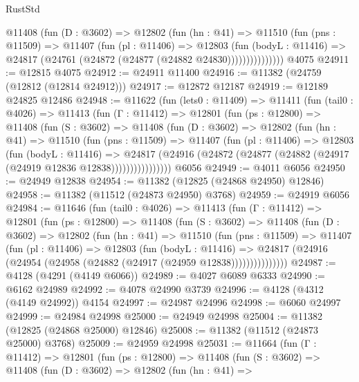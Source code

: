 \begin{lexlean}{RustStd}
\begin{coremodule}
              @11408
                (fun (D : @3602) =>
                @12802
                  (fun (hn : @41) =>
                  @11510
                    (fun (pns : @11509) =>
                    @11407
                      (fun (pl : @11406) =>
                      @12803
                        (fun (bodyL : @11416) =>
                        @24817 (@24761 (@24872 (@24877 (@24882 @24830)))))))))))))))
    @4075
@24911 := @12815 @4075
@24912 := @24911 @11400
@24916 := @11382 (@24759 (@12812 (@12814 @24912)))
@24917 := @12872 @12187
@24919 := @12189 @24825 @12486
@24948 := @11622
    (fun (lets0 : @11409) =>
    @11411
      (fun (tail0 : @4026) =>
      @11413
        (fun (Γ : @11412) =>
        @12801
          (fun (ps : @12800) =>
          @11408
            (fun (S : @3602) =>
            @11408
              (fun (D : @3602) =>
              @12802
                (fun (hn : @41) =>
                @11510
                  (fun (pns : @11509) =>
                  @11407
                    (fun (pl : @11406) =>
                    @12803
                      (fun (bodyL : @11416) =>
                      @24817
                        (@24916
                          (@24872 (@24877 (@24882 (@24917 (@24919 @12836 @12838))))))))))))))))
    @6056
@24949 := @4011 @6056
@24950 := @24949 @12838
@24954 := @11382 (@12825 (@24868 @24950) @12846)
@24958 := @11382 (@11512 (@24873 @24950) @3768)
@24959 := @24919 @6056
@24984 := @11646
    (fun (tail0 : @4026) =>
    @11413
      (fun (Γ : @11412) =>
      @12801
        (fun (ps : @12800) =>
        @11408
          (fun (S : @3602) =>
          @11408
            (fun (D : @3602) =>
            @12802
              (fun (hn : @41) =>
              @11510
                (fun (pns : @11509) =>
                @11407
                  (fun (pl : @11406) =>
                  @12803
                    (fun (bodyL : @11416) =>
                    @24817 (@24916 (@24954 (@24958 (@24882 (@24917 (@24959 @12838)))))))))))))))
@24987 := @4128 (@4291 (@4149 @6066))
@24989 := @4027 @6089 @6333
@24990 := @6162 @24989
@24992 := @4078 @24990 @3739
@24996 := @4128 (@4312 (@4149 @24992)) @4154
@24997 := @24987 @24996
@24998 := @6060 @24997
@24999 := @24984 @24998
@25000 := @24949 @24998
@25004 := @11382 (@12825 (@24868 @25000) @12846)
@25008 := @11382 (@11512 (@24873 @25000) @3768)
@25009 := @24959 @24998
@25031 := @11664
    (fun (Γ : @11412) =>
    @12801
      (fun (ps : @12800) =>
      @11408
        (fun (S : @3602) =>
        @11408
          (fun (D : @3602) =>
          @12802
            (fun (hn : @41) =>

\end{coremodule}
\end{lexlean}
